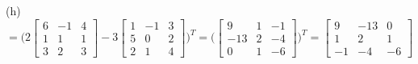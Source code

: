 \documentclass[addpoints]{exam}
\begin{document}
\begin{questions}
\begin{solution}
        (h) $ = \Biggl( 2\begin{bmatrix}
            6 & -1 & 4 \\ 1 & 1 & 1 \\ 3 & 2 & 3
        \end{bmatrix} - 3\begin{bmatrix}
            1 & -1 & 3 \\ 5 & 0 & 2 \\ 2 & 1 & 4
        \end{bmatrix} \Biggr)^T = \Biggl( \begin{bmatrix}
            9 & 1 & -1 \\ 
            -13 & 2 & -4 \\ 
            0 & 1 & -6
        \end{bmatrix} \Biggr)^T = \begin{bmatrix}
            9 & -13 & 0 \\ 1 & 2 & 1 \\ -1 & -4 & -6
        \end{bmatrix} $

    \end{solution}
\end{questions}
\end{document}
